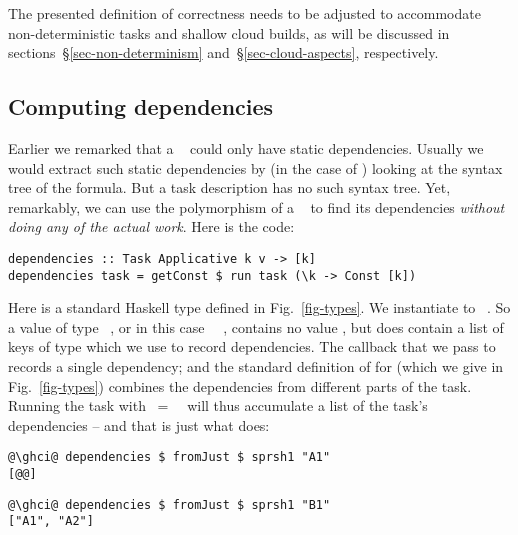 The presented definition of correctness needs to be adjusted to accommodate
non-deterministic tasks and shallow cloud builds, as will be discussed
in sections~\S\ref{sec-non-determinism} and~\S\ref{sec-cloud-aspects},
respectively.

\subsection{Computing dependencies}\label{sec-deps}\label{secdeps}

Earlier we remarked that a ~ could only have static
dependencies. Usually we would extract such static dependencies by (in the case
of \Excel) looking at the syntax tree of the formula.  But a task description
has no such syntax tree. Yet, remarkably, we can use the polymorphism of a
~ to find its dependencies \emph{without doing any of
the actual work}. Here is the code:

\vspace{1mm}
\begin{verbatim}
dependencies :: Task Applicative k v -> [k]
dependencies task = getConst $ run task (\k -> Const [k])
\end{verbatim}
\vspace{1mm}

\noindent
Here  is a standard Haskell type defined in Fig.~\ref{fig-types}. We
instantiate  to ~\hs{[@@k]}. So a value of type ~,
or in this case ~\hs{[@@k]}~, contains no value , but does
contain a list of keys of type \hs{[@@k]} which we use to record dependencies.
The  callback that we pass to  records a single dependency;
and the standard definition of  for  (which we give
in Fig.~\ref{fig-types}) combines the dependencies from different parts of the
task. Running the task with ~=~~\hs{[@@k]} will thus
accumulate a list of the task's dependencies -- and that is just what
 does:
\vspace{1mm}
\begin{verbatim}
@\ghci@ dependencies $ fromJust $ sprsh1 "A1"
[@@]
\end{verbatim}
\begin{verbatim}
@\ghci@ dependencies $ fromJust $ sprsh1 "B1"
["A1", "A2"]
\end{verbatim}
\vspace{1mm}

